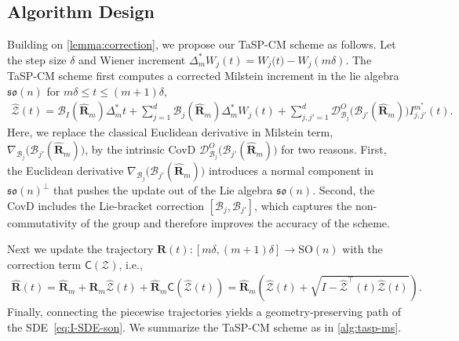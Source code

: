 \documentclass[11pt, a4paper, onecolumn]{article}
\newcommand{\SOn}{\mathrm{SO}(n)}
\newcommand{\son}{\mathfrak{so}(n)}
\newcommand{\sonp}{\mathfrak{so}(n)^{\perp}}
\newcommand{\m}{m}
\newcommand{\DO}{\tg D^{O}}
\newcommand{\bfR}{\mathbf{R}}
\newcommand{\Z}{\mathcal{Z}}
\newcommand{\B}{\mathcal{B}}
\newcommand{\hatZ}{\widehat{\Z}}
\newcommand{\hatR}{\widehat{\bfR}}
\newcommand{\nmC}{\mathsf{C}}
\newcommand{\tg}[1]{\mathcal{#1}}
\newcommand{\ms}{{m^*}}
\newcommand{\Dms}{{\Delta^{*}_{m}}}
\newcommand{\Ijjpms}{ {I_{j,j'}^{\ms}} }
\newcommand{\Der}[4]{
  #1_{#2}\bigl(#3(#4)\bigr)
}
\newcommand{\DerDOjjp}[1]{\Der{\DO}{\B_j}{\B_{j'}}{#1}}
\newcommand{\DerNjjp}[1]{\Der{\nabla}{\B_j}{\B_{j'}}{#1}}
\begin{document}
\subsection{Algorithm Design}
Building on \cref{lemma:correction}, we propose our TaSP-CM scheme as follows. Let the step size $\delta$ and Wiener increment $\Dms W_{j}(t) = W_j\bigl( t \bigr) - W_j(m\delta)$. The TaSP-CM scheme first computes a corrected Milstein increment in the lie algebra $\son$ for $m\delta \le t \le (m+1)\delta$,
\begin{align}\label{eq:milZ}
    \hatZ(t) = \B_I(\hatR_{\m})\Dms t + \sum_{j=1}^d \B_j(\hatR_{\m}) \Dms W_{j}(t) + \sum_{j,j'=1}^d  \DerDOjjp{\hatR_m} \Ijjpms(t).  \nonumber 
\end{align}
Here, we replace the classical Euclidean derivative in Milstein term, $\DerNjjp{\hatR_m}$, by the intrinsic CovD $\DerDOjjp{\hatR_m}$ for two reasons. First, the Euclidean derivative $\DerNjjp{\hatR_m}$ introduces a normal component in $\sonp$ that pushes the update out of the Lie algebra $\mathfrak{so}(n)$. Second, the CovD includes the Lie-bracket correction $[\B_j,\B_{j'}]$, which captures the non-commutativity of the group and therefore improves the accuracy of the scheme.

Next we update the trajectory $\bfR(t): [m\delta,(m+1)\delta] \to \SOn $ with the correction term $\nmC(\Z)$, i.e.,
\begin{align*}
    \hatR(t) = \hatR_m + \bfR_m\hatZ(t) + \hatR_m\nmC(\hatZ(t)) = \hatR_m(\hatZ(t) + \sqrt{I - \hatZ^{\top}(t) \hatZ(t)}).
\end{align*}
Finally, connecting the piecewise trajectories yields a geometry‑preserving path of the SDE~\cref{eq:I-SDE-son}. We summarize the TaSP-CM scheme as in \cref{alg:tasp-ms}.
\end{document}
